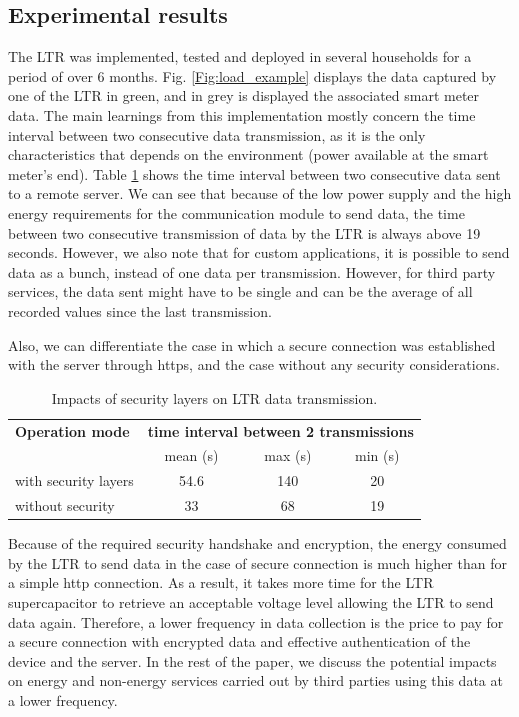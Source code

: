 \documentclass[conference]{IEEEtran}
\begin{document}
\subsection{Experimental results}
The LTR was implemented, tested and deployed in several households for a period of over 6 months. Fig. \ref{Fig:load_example} displays the data captured by one of the LTR in green, and in grey is displayed the associated smart meter data. The main learnings from this implementation mostly concern the time interval between two consecutive data transmission, as it is the only characteristics that depends on the environment (power available at the smart meter's end). Table \ref{Table:securityimpact} shows the time interval between two consecutive data sent to a remote server. We can see that because of the low power supply and the high energy requirements for the communication module to send data, the time between  two consecutive transmission of data by the LTR is always above 19 seconds. However, we also note that for custom applications, it is possible to send data as a bunch, instead of one data per transmission. However, for third party services, the data sent might have to be single and can be the average of all recorded values since the last transmission.

Also, we can differentiate the case in which a secure connection was established with the server through https, and the case without any security considerations. 

%
		\begin{table}[h]
	\caption{Impacts of security layers on LTR data transmission.} %
	\label{Table:securityimpact}
	\small %
	\centering %
	\begin{tabular}{lccc} %
		\toprule[\heavyrulewidth]\toprule[\heavyrulewidth]
		\textbf{Operation mode} &  \multicolumn{3}{c}{ \textbf{time interval between 2 transmissions }} \\

		\textbf{} &  mean (s) &  max (s) &  min (s)\\		
		\midrule
		with security layers & 54.6 & 140 & 20 \\ 
	without security  & 33 & 68 & 19 \\ 
		\bottomrule[\heavyrulewidth] 
	\end{tabular}
\end{table}
%

Because of the required security handshake and encryption, the energy consumed by the LTR to send data in the case of secure connection is much higher than for a simple http connection. As a result, it takes more time for the LTR supercapacitor to retrieve an acceptable voltage level allowing the LTR to send data again. Therefore, a lower frequency in data collection is the price to pay for a secure connection with encrypted data and effective authentication of the device and the server. In the rest of the paper, we discuss the potential impacts on energy and non-energy services carried out by third parties using this data at a lower frequency. 
 
\end{document}
